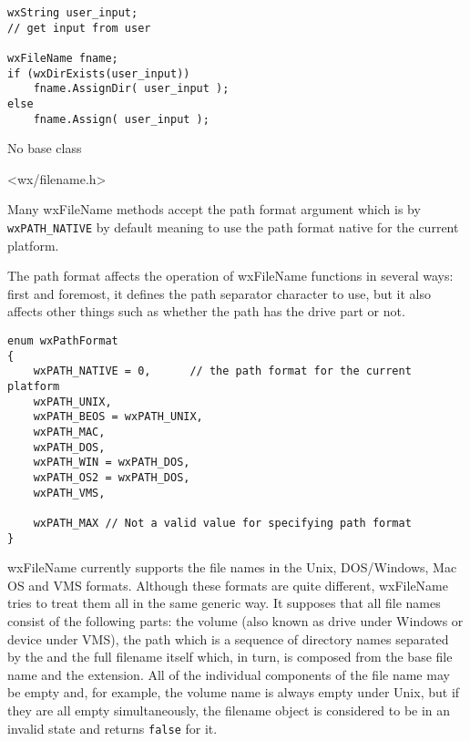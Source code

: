 \begin{verbatim}
wxString user_input;
// get input from user

wxFileName fname;
if (wxDirExists(user_input))
    fname.AssignDir( user_input );
else
    fname.Assign( user_input );
\end{verbatim}


No base class


<wx/filename.h>




Many wxFileName methods accept the path format argument which is by\rtfsp
{\tt wxPATH\_NATIVE} by default meaning to use the path format native for the
current platform.

The path format affects the operation of wxFileName functions in several ways:
first and foremost, it defines the path separator character to use, but it also
affects other things such as whether the path has the drive part or not.

\begin{verbatim}
enum wxPathFormat
{
    wxPATH_NATIVE = 0,      // the path format for the current platform
    wxPATH_UNIX,
    wxPATH_BEOS = wxPATH_UNIX,
    wxPATH_MAC,
    wxPATH_DOS,
    wxPATH_WIN = wxPATH_DOS,
    wxPATH_OS2 = wxPATH_DOS,
    wxPATH_VMS,

    wxPATH_MAX // Not a valid value for specifying path format
}
\end{verbatim}



\label{filenameformat}

wxFileName currently supports the file names in the Unix, DOS/Windows, Mac OS
and VMS formats. Although these formats are quite different, wxFileName tries
to treat them all in the same generic way. It supposes that all file names
consist of the following parts: the volume (also known as drive under Windows
or device under VMS), the path which is a sequence of directory names separated
by the  and the full
filename itself which, in turn, is composed from the base file name and the
extension. All of the individual components of the file name may be empty and,
for example, the volume name is always empty under Unix, but if they are all
empty simultaneously, the filename object is considered to be in an invalid
state and  returns {\tt false} for it.

